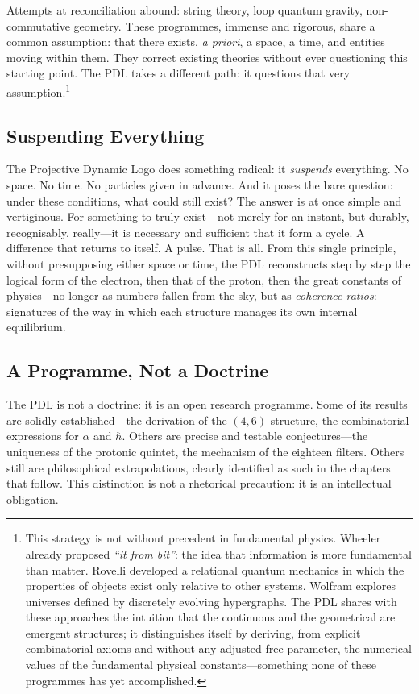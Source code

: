 \documentclass[12pt, a4paper, openright]{book}
\begin{document}
Attempts at reconciliation abound: string theory, loop quantum gravity, non-commutative geometry. These programmes, immense and rigorous, share a common assumption: that there exists, \emph{a priori}, a space, a time, and entities moving within them. They correct existing theories without ever questioning this starting point. The PDL takes a different path: it questions that very assumption.\footnote{This strategy is not without precedent in fundamental physics. Wheeler already proposed \emph{``it from bit''}: the idea that information is more fundamental than matter. Rovelli developed a relational quantum mechanics in which the properties of objects exist only relative to other systems. Wolfram explores universes defined by discretely evolving hypergraphs. The PDL shares with these approaches the intuition that the continuous and the geometrical are emergent structures; it distinguishes itself by deriving, from explicit combinatorial axioms and without any adjusted free parameter, the numerical values of the fundamental physical constants---something none of these programmes has yet accomplished.}

\subsection*{Suspending Everything}

The Projective Dynamic Logo does something radical: it \emph{suspends} everything. No space. No time. No particles given in advance. And it poses the bare question: under these conditions, what could still exist? The answer is at once simple and vertiginous. For something to truly exist---not merely for an instant, but durably, recognisably, really---it is necessary and sufficient that it form a cycle. A difference that returns to itself. A pulse. That is all. From this single principle, without presupposing either space or time, the PDL reconstructs step by step the logical form of the electron, then that of the proton, then the great constants of physics---no longer as numbers fallen from the sky, but as \emph{coherence ratios}: signatures of the way in which each structure manages its own internal equilibrium.

\subsection*{A Programme, Not a Doctrine}

The PDL is not a doctrine: it is an open research programme. Some of its results are solidly established---the derivation of the $(4,6)$ structure, the combinatorial expressions for $\alpha$ and $\hbar$. Others are precise and testable conjectures---the uniqueness of the protonic quintet, the mechanism of the eighteen filters. Others still are philosophical extrapolations, clearly identified as such in the chapters that follow. This distinction is not a rhetorical precaution: it is an intellectual obligation.
\end{document}
